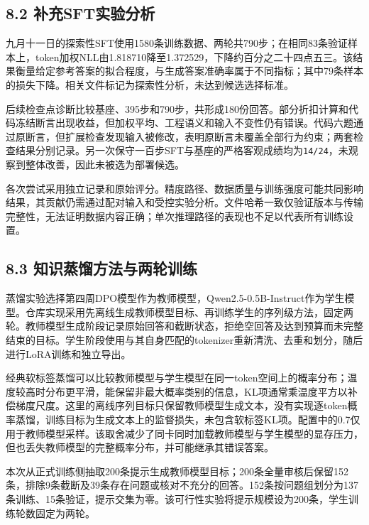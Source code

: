\documentclass[UTF8,fontset=fandol,a4paper,11pt]{ctexart}
\begin{document}
\subsection{8.2 补充SFT实验分析}\label{ux8865ux5145sftux5b9eux9a8cux5206ux6790}

九月十一日的探索性SFT使用1580条训练数据、两轮共790步；在相同83条验证样本上，token加权NLL由1.818710降至1.372529，下降约百分之二十四点五三。该结果衡量给定参考答案的拟合程度，与生成答案准确率属于不同指标；其中79条样本的损失下降。相关文件标记为探索性分析，未达到候选选择标准。

{后续检查点诊断比较基座、395步和790步，共形成180份回答。部分折扣计算和代码冻结断言出现收益，但加权平均、工程语义和输入不变性仍有错误。代码六题通过原断言，但扩展检查发现输入被修改，表明原断言未覆盖全部行为约束；两套检查结果分别记录。另一次保守一百步SFT与基座的严格客观成绩均为\nolinkurl{14/24}，未观察到整体改善，因此未被选为部署候选。}

各次尝试采用独立记录和原始评分。精度路径、数据质量与训练强度可能共同影响结果，其贡献仍需通过配对输入和受控实验分析。文件哈希一致仅验证版本与传输完整性，无法证明数据内容正确；单次推理路径的表现也不足以代表所有训练设置。

\subsection{8.3 知识蒸馏方法与两轮训练}\label{ux77e5ux8bc6ux84b8ux998fux65b9ux6cd5ux4e0eux4e24ux8f6eux8badux7ec3}

蒸馏实验选择第四周DPO模型作为教师模型，Qwen2.5-0.5B-Instruct作为学生模型。仓库实现采用先离线生成教师模型目标、再训练学生的序列级方法，固定两轮。教师模型生成阶段记录原始回答和截断状态，拒绝空回答及达到预算而未完整结束的目标。学生阶段使用与其自身匹配的tokenizer重新清洗、去重和划分，随后进行LoRA训练和独立导出。

经典软标签蒸馏可以比较教师模型与学生模型在同一token空间上的概率分布；温度较高时分布更平滑，能保留非最大概率类别的信息，KL项通常乘温度平方以补偿梯度尺度。这里的离线序列目标只保留教师模型生成文本，没有实现逐token概率蒸馏，训练目标为生成文本上的监督损失，未包含软标签KL项。配置中的0.7仅用于教师模型采样。该取舍减少了同卡同时加载教师模型与学生模型的显存压力，但也丢失教师模型的完整概率分布，并可能继承其错误答案。

本次从正式训练侧抽取200条提示生成教师模型目标；200条全量审核后保留152条，排除9条截断及39条存在问题或核对不充分的回答。152条按问题组划分为137条训练、15条验证，提示交集为零。该可行性实验将提示规模设为200条，学生训练轮数固定为两轮。
\end{document}
